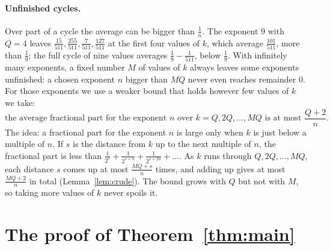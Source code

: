 \documentclass[10pt]{article}
\theoremstyle{plain}
\theoremstyle{definition}
\theoremstyle{remark}
\begin{document}
\paragraph{Unfinished cycles.} Over part of a cycle the average can be
bigger than $\tfrac1n$. The exponent $9$ with $Q=4$ leaves $\tfrac{15}{511},\tfrac{255}{511},\tfrac7{511},\tfrac{127}{511}$
at the first four values of $k$, which average $\tfrac{101}{511}$, more than
$\tfrac19$; the full cycle of nine values averages $\tfrac19-\tfrac1{511}$,
below $\tfrac19$. With infinitely many exponents, a fixed number $M$ of values
of $k$ always leaves some exponents unfinished: a chosen exponent $n$ bigger
than $MQ$ never even reaches remainder $0$. For those exponents we use a
weaker bound that holds however few values of $k$ we take:
\[
 \text{the average fractional part for the exponent $n$ over }k=Q,2Q,\dots,MQ
 \text{ is at most }\frac{Q+2}n .
\]
The idea: a fractional part for the exponent $n$ is large only when $k$ is just below a
multiple of $n$. If $s$ is the distance from $k$ up to the next multiple of
$n$, the fractional part is less than $\tfrac1{2^s}+\tfrac1{2^{s+n}}+\tfrac1{2^{s+2n}}+\dots$.
As $k$ runs through $Q,2Q,\dots,MQ$, each distance $s$ comes up at most
$\tfrac{MQ+s}n$ times, and adding up gives at most $\tfrac{MQ+2}n$ in total
(Lemma~\ref{lem:crude}). The bound grows with $Q$ but not with $M$, so taking
more values of $k$ never spoils it.

\section{The proof of Theorem~\ref{thm:main}}\label{sec:proof}
\end{document}
